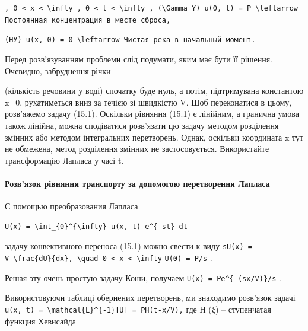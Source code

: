 \documentclass[
  ukrainian,
]{article}
\begin{document}
\texttt{,\ \textquotesingle{}0\ \textless{}\ x\ \textless{}\ \textbackslash{}infty\textquotesingle{}\ ,\ \textquotesingle{}0\ \textless{}\ t\ \textless{}\ \textbackslash{}infty\textquotesingle{}\ ,\ \textquotesingle{}(\textbackslash{}Gamma\ Y)\textquotesingle{}\ \textquotesingle{}u(0,\ t)\ =\ P\ \textbackslash{}leftarrow\textquotesingle{}\ Постоянная\ концентрация\ в\ месте\ сброса,}

\texttt{(НУ)\ \textquotesingle{}u(x,\ 0)\ =\ 0\ \textbackslash{}leftarrow\textquotesingle{}\ Чистая\ река\ в\ начальный\ момент.}

Перед розв'язуванням проблеми слід подумати, яким має бути її рішення.
Очевидно, забруднення річки

(кількість речовини у воді) спочатку буде нуль, а потім, підтримувана
константою x=0, рухатиметься вниз за течією зі швидкістю V. Щоб
переконатися в цьому, розв'яжемо задачу (15.1). Оскільки рівняння (15.1)
є лінійним, а гранична умова також лінійна, можна сподіватися розв'язати
цю задачу методом розділення змінних або методом інтегральних
перетворень. Однак, оскільки координата x тут не обмежена, метод
розділення змінних не застосовується. Використайте трансформацію Лапласа
у часі t.

\paragraph{Розв'язок рівняння транспорту за допомогою перетворення
Лапласа}\label{ux440ux43eux437ux432ux44fux437ux43eux43a-ux440ux456ux432ux43dux44fux43dux43dux44f-ux442ux440ux430ux43dux441ux43fux43eux440ux442ux443-ux437ux430-ux434ux43eux43fux43eux43cux43eux433ux43eux44e-ux43fux435ux440ux435ux442ux432ux43eux440ux435ux43dux43dux44f-ux43bux430ux43fux43bux430ux441ux430}

С помощью преобразования Лапласа

\begin{verbatim}
U(x) = \int_{0}^{\infty} u(x, t) e^{-st} dt
\end{verbatim}

задачу конвективного переноса (15.1) можно свести к виду
\texttt{sU(x)\ =\ -V\ \textbackslash{}frac\{dU\}\{dx\},\ \textbackslash{}quad\ 0\ \textless{}\ x\ \textless{}\ \textbackslash{}infty}
\texttt{U(0)\ =\ P/s} .

Решая эту очень простую задачу Коши, получаем
\texttt{U(x)\ =\ Pe\^{}\{-(sx/V)\}/s} .

Використовуючи таблиці обернених перетворень, ми знаходимо розв'язок
задачі
\texttt{u(x,\ t)\ =\ \textbackslash{}mathcal\{L\}\^{}\{-1\}{[}U{]}\ =\ PH(t-x/V),}
где Н (ξ) -- ступенчатая функция Хевисайда
\end{document}
